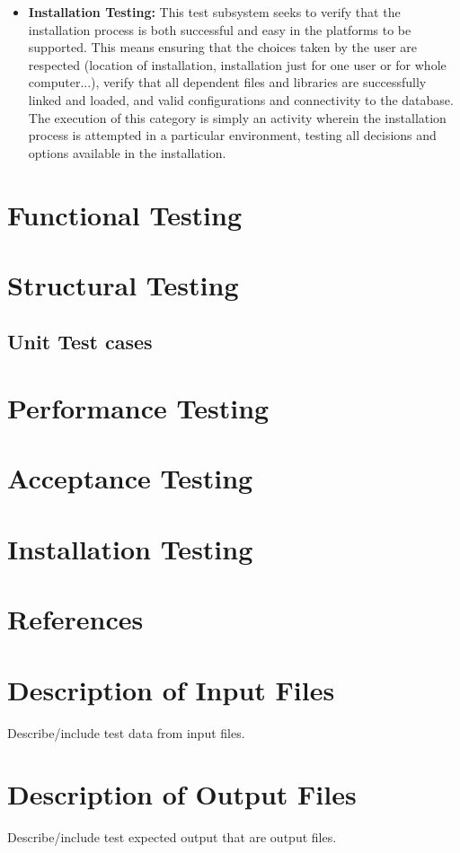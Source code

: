 \documentclass[12pt]{article}
\begin{document}
\begin{itemize}
    \item \textbf{Installation Testing:} This test subsystem seeks to verify that the installation process is both successful and easy in the platforms to be supported. This means ensuring that the choices taken by the user are respected (location of installation, installation just for one user or for whole computer...), verify that all dependent files and libraries are successfully linked and loaded, and valid configurations and connectivity to the database. The execution of this category is simply an activity wherein the installation process is attempted in a particular environment, testing all decisions and options available in the installation.
\end{itemize}

\section{Functional Testing}


\section{Structural Testing}

\subsection{Unit Test cases}


\section{Performance Testing}


\section{Acceptance Testing}
\section{Installation Testing}

\section{References}

\appendix

\section{Description of Input Files}

Describe/include test data from input files.

\section{Description of Output Files}

Describe/include test expected output that are output files.
\end{document}
